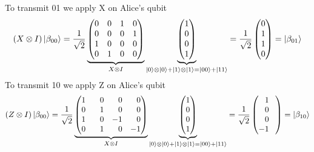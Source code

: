 \documentclass[a4paper,12pt]{article}
\begin{document}
\begin{enumerate}[label=(\alph*)]
    To transmit 01 we apply X on Alice's qubit 
    \[(X \otimes I)\ket{\beta_{00}} = \frac{1}{\sqrt{2}} \underbrace{\begin{pmatrix}
        0 & 0 & 1 & 0 \\
        0 & 0 & 0 & 1 \\
        1 & 0 & 0 & 0 \\
        0 & 1 & 0 & 0 \\
    \end{pmatrix}}_{X \otimes I} \underbrace{\begin{pmatrix}
        1 \\
        0 \\
        0 \\
        1 \\
    \end{pmatrix}}_{\ket{0} \otimes \ket{0} + \ket{1} \otimes \ket{1} = \ket{00} +\ket{11}} = \frac{1}{\sqrt{2}}\begin{pmatrix}
        0 \\
        1 \\
        1 \\
        0 \\
    \end{pmatrix}  = \ket{\beta_{01}}\]
    To transmit 10 we apply Z on Alice's qubit 
    \[(Z \otimes I)\ket{\beta_{00}} = \frac{1}{\sqrt{2}} \underbrace{\begin{pmatrix}
        1 & \phantom{-}0 & \phantom{-}0 & \phantom{-}0 \\
        0 & \phantom{-}1 & \phantom{-}0 & \phantom{-}0 \\
        1 & \phantom{-}0 & -1 & \phantom{-}0 \\
        0 & \phantom{-}1 & \phantom{-}0 & -1 \\
    \end{pmatrix}}_{X \otimes I} \underbrace{\begin{pmatrix}
        1 \\
        0 \\
        0 \\
        1 \\
    \end{pmatrix}}_{\ket{0} \otimes \ket{0} + \ket{1} \otimes \ket{1} = \ket{00} +\ket{11}} = \frac{1}{\sqrt{2}}\begin{pmatrix}
        \phantom{-}1\phantom{-} \\
        \phantom{-}0\phantom{-} \\
        \phantom{-}0\phantom{-} \\
        -1\phantom{-} \\
    \end{pmatrix}  = \ket{\beta_{10}}\]


\end{enumerate}
\end{document}
